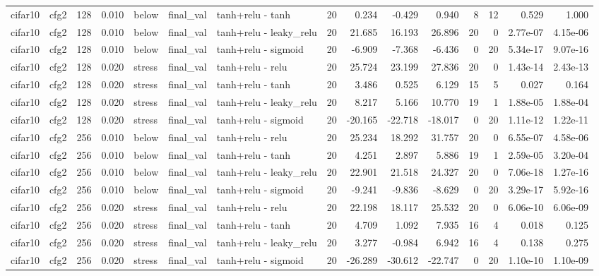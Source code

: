 \begin{table}[htbp]
{\begin{tabular}{@{}llrrlllrrrrrrrr@{}}
cifar10 & cfg2 & 128 & 0.010 & below & final\_val & tanh+relu - tanh & 20 & 0.234 & -0.429 & 0.940 & 8 & 12 & 0.529 & 1.000 \\
cifar10 & cfg2 & 128 & 0.010 & below & final\_val & tanh+relu - leaky\_relu & 20 & 21.685 & 16.193 & 26.896 & 20 & 0 & 2.77e-07 & 4.15e-06 \\
cifar10 & cfg2 & 128 & 0.010 & below & final\_val & tanh+relu - sigmoid & 20 & -6.909 & -7.368 & -6.436 & 0 & 20 & 5.34e-17 & 9.07e-16 \\
cifar10 & cfg2 & 128 & 0.020 & stress & final\_val & tanh+relu - relu & 20 & 25.724 & 23.199 & 27.836 & 20 & 0 & 1.43e-14 & 2.43e-13 \\
cifar10 & cfg2 & 128 & 0.020 & stress & final\_val & tanh+relu - tanh & 20 & 3.486 & 0.525 & 6.129 & 15 & 5 & 0.027 & 0.164 \\
cifar10 & cfg2 & 128 & 0.020 & stress & final\_val & tanh+relu - leaky\_relu & 20 & 8.217 & 5.166 & 10.770 & 19 & 1 & 1.88e-05 & 1.88e-04 \\
cifar10 & cfg2 & 128 & 0.020 & stress & final\_val & tanh+relu - sigmoid & 20 & -20.165 & -22.718 & -18.017 & 0 & 20 & 1.11e-12 & 1.22e-11 \\
cifar10 & cfg2 & 256 & 0.010 & below & final\_val & tanh+relu - relu & 20 & 25.234 & 18.292 & 31.757 & 20 & 0 & 6.55e-07 & 4.58e-06 \\
cifar10 & cfg2 & 256 & 0.010 & below & final\_val & tanh+relu - tanh & 20 & 4.251 & 2.897 & 5.886 & 19 & 1 & 2.59e-05 & 3.20e-04 \\
cifar10 & cfg2 & 256 & 0.010 & below & final\_val & tanh+relu - leaky\_relu & 20 & 22.901 & 21.518 & 24.327 & 20 & 0 & 7.06e-18 & 1.27e-16 \\
cifar10 & cfg2 & 256 & 0.010 & below & final\_val & tanh+relu - sigmoid & 20 & -9.241 & -9.836 & -8.629 & 0 & 20 & 3.29e-17 & 5.92e-16 \\
cifar10 & cfg2 & 256 & 0.020 & stress & final\_val & tanh+relu - relu & 20 & 22.198 & 18.117 & 25.532 & 20 & 0 & 6.06e-10 & 6.06e-09 \\
cifar10 & cfg2 & 256 & 0.020 & stress & final\_val & tanh+relu - tanh & 20 & 4.709 & 1.092 & 7.935 & 16 & 4 & 0.018 & 0.125 \\
cifar10 & cfg2 & 256 & 0.020 & stress & final\_val & tanh+relu - leaky\_relu & 20 & 3.277 & -0.984 & 6.942 & 16 & 4 & 0.138 & 0.275 \\
cifar10 & cfg2 & 256 & 0.020 & stress & final\_val & tanh+relu - sigmoid & 20 & -26.289 & -30.612 & -22.747 & 0 & 20 & 1.10e-10 & 1.10e-09 \\

\end{tabular}}
\end{table}
